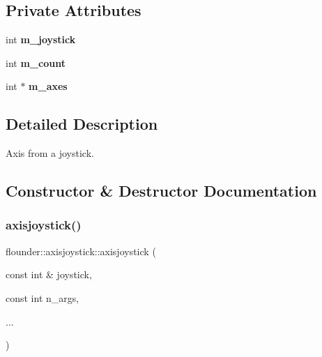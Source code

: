 \subsection*{Private Attributes}
\begin{DoxyCompactItemize}
\item 
\mbox{\label{classflounder_1_1axisjoystick_a8107a9ae34c0ceb53d95efd7f5271db3}} 
int {\bfseries m\+\_\+joystick}
\item 
\mbox{\label{classflounder_1_1axisjoystick_a55c01fefa2832605ff86d610b67cc704}} 
int {\bfseries m\+\_\+count}
\item 
\mbox{\label{classflounder_1_1axisjoystick_aad5c6ca1cfef2ef2f525aa7d7ab76b9b}} 
int $\ast$ {\bfseries m\+\_\+axes}
\end{DoxyCompactItemize}


\subsection{Detailed Description}
Axis from a joystick. 



\subsection{Constructor \& Destructor Documentation}
\mbox{\label{classflounder_1_1axisjoystick_a6415074e9ce0f9aae1d8071dc90a5f93}} 
\subsubsection{\texorpdfstring{axisjoystick()}{axisjoystick()}}
{\footnotesize\ttfamily flounder\+::axisjoystick\+::axisjoystick (\begin{DoxyParamCaption}\item[{const int \&}]{joystick,  }\item[{const int}]{n\+\_\+args,  }\item[{}]{... }\end{DoxyParamCaption})\hspace{0.3cm}{\ttfamily [inline]}}



